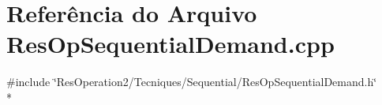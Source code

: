 \section{Referência do Arquivo Res\+Op\+Sequential\+Demand.\+cpp}
\label{_res_op_sequential_demand_8cpp}
{\ttfamily \#include \char`\"{}Res\+Operation2/\+Tecniques/\+Sequential/\+Res\+Op\+Sequential\+Demand.\+h\char`\"{}}\\*
